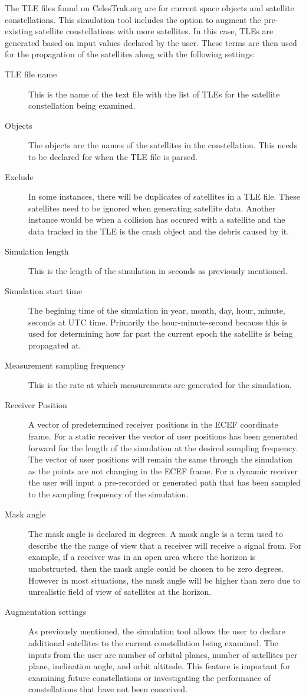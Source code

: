 \documentclass[12pt]{report}
\begin{document}
The TLE files found on CelesTrak.org are for current space objects and satellite constellations. This simulation tool includes the option to augment the pre-existing satellite constellations with more satellites. In this case, TLEs are generated based on input values declared by the user. These terms are then used for the propagation of the satellites along with the following settings:
\begin{description}
    \item[TLE file name] This is the name of the text file with the list of TLEs for the satellite constellation being examined.
    \item[Objects] The objects are the names of the satellites in the constellation. This needs to be declared for when the TLE file is parsed.
    \item[Exclude] In some instances, there will be duplicates of satellites in a TLE file. These satellites need to be ignored when generating satellite data. Another instance would be when a collision has occured with a satellite and the data tracked in the TLE is the crash object and the debris caused by it.
    \item[Simulation length] This is the length of the simulation in seconds as previously mentioned.
    \item[Simulation start time] The begining time of the simulation in year, month, day, hour, minute, seconds at UTC time. Primarily the hour-minute-second because this is used for determining how far past the current epoch the satellite is being propagated at. 
    \item[Measurement sampling frequency] This is the rate at which measurements are generated for the simulation. 
    \item[Receiver Position] A vector of predetermined receiver positions in the ECEF coordinate frame. For a static receiver the vector of user positions has been generated forward for the length of the simulation at the desired sampling frequency. The vector of user positions will remain the same through the simulation as the points are not changing in the ECEF frame. For a dynamic receiver the user will input a pre-recorded or generated path that has been sampled to the sampling frequency of the simulation.
    \item[Mask angle] The mask angle is declared in degrees. A mask angle is a term used to describe the the range of view that a receiver will receive a signal from. For example, if a receiver was in an open area where the horizon is unobstructed, then the mask angle could be chosen to be zero degrees. However in most situations, the mask angle will be higher than zero due to unrealistic field of view of satellites at the horizon.
    \item[Augmentation settings] As previously mentioned, the simulation tool allows the user to declare additional satellites to the current constellation being examined. The inputs from the user are number of orbital planes, number of satellites per plane, inclination angle, and orbit altitude. This feature is important for examining future constellations or investigating the performance of constellations that have not been conceived.
\end{description}
\end{document}
